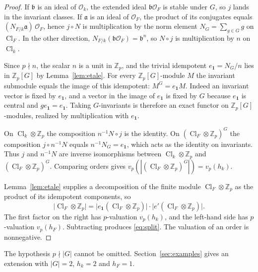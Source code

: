 \documentclass[11pt]{article}
\theoremstyle{plain}
\theoremstyle{definition}
\theoremstyle{remark}
\newcommand{\Z}{\mathbb{Z}}
\newcommand{\OK}{\mathcal{O}}
\newcommand{\Cl}{\operatorname{Cl}}
\newcommand{\triv}{\mathbf{1}}
\begin{document}
\begin{proof}
If $\mathfrak{b}$ is an ideal of $\OK_k$, the extended ideal $\mathfrak{b}\OK_F$ is stable under $G$, so $j$ lands in the invariant classes.
If $\mathfrak{a}$ is an ideal of $\OK_F$, the product of its conjugates equals $(N_{F/k}\mathfrak{a})\,\OK_F$, hence $j\circ N$ is multiplication by the norm element $N_G=\sum_{g\in G}g$ on $\Cl_F$.
In the other direction, $N_{F/k}(\mathfrak{b}\OK_F)=\mathfrak{b}^{n}$, so $N\circ j$ is multiplication by $n$ on $\Cl_k$.

Since $p\nmid n$, the scalar $n$ is a unit in $\Z_p$, and the trivial idempotent $e_{\triv}=N_G/n$ lies in $\Z_p[G]$ by Lemma~\ref{lem:etale}.
For every $\Z_p[G]$-module $M$ the invariant submodule equals the image of this idempotent: $M^{G}=e_{\triv}M$.
Indeed an invariant vector is fixed by $e_{\triv}$, and a vector in the image of $e_{\triv}$ is fixed by $G$ because $e_{\triv}$ is central and $ge_{\triv}=e_{\triv}$.
Taking $G$-invariants is therefore an exact functor on $\Z_p[G]$-modules, realized by multiplication with $e_{\triv}$.

On $\Cl_k\otimes\Z_p$ the composition $n^{-1}N\circ j$ is the identity.
On $(\Cl_F\otimes\Z_p)^{G}$ the composition $j\circ n^{-1}N$ equals $n^{-1}N_G=e_{\triv}$, which acts as the identity on invariants.
Thus $j$ and $n^{-1}N$ are inverse isomorphisms between $\Cl_k\otimes\Z_p$ and $(\Cl_F\otimes\Z_p)^{G}$.
Comparing orders gives $v_p(|(\Cl_F\otimes\Z_p)^{G}|)=v_p(h_k)$.

Lemma~\ref{lem:etale} supplies a decomposition of the finite module $\Cl_F\otimes\Z_p$ as the product of its idempotent components, so
\[
  \bigl|\Cl_F\otimes\Z_p\bigr|
  =\bigl|e_{\triv}(\Cl_F\otimes\Z_p)\bigr|\cdot\bigl|e'(\Cl_F\otimes\Z_p)\bigr|.
\]
The first factor on the right has $p$-valuation $v_p(h_k)$, and the left-hand side has $p$-valuation $v_p(h_F)$.
Subtracting produces \eqref{eq:split}.
The valuation of an order is nonnegative.
\end{proof}

The hypothesis $p\nmid|G|$ cannot be omitted.
Section~\ref{sec:examples} gives an extension with $|G|=2$, $h_k=2$ and $h_F=1$.
\end{document}
